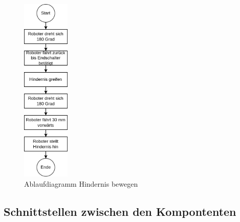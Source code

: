 \begin{figure}[H]
\centering
\includegraphics[width=0.2\textwidth]{assets/gesamtkonzept/ablaufdiagramm-hindernis-bewegen.png}
\caption{Ablaufdiagramm Hindernis bewegen}
\label{fig:ablaufdiagramm-hindernis-bewegen}
\end{figure}





\subsection{Schnittstellen zwischen den Kompontenten}



